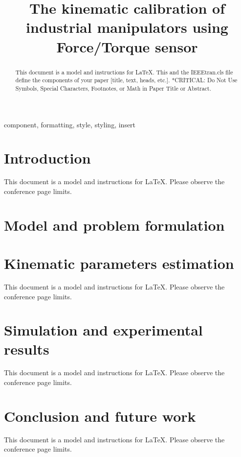 \documentclass[conference]{IEEEtran}
\begin{document}
\title{
    The kinematic calibration of industrial manipulators using Force/Torque sensor
}

\author{
}

\maketitle

\begin{abstract}
    This document is a model and instructions for \LaTeX.
    This and the IEEEtran.cls file define the components of your paper [title, text, heads, etc.]. *CRITICAL: Do Not Use Symbols, Special Characters, Footnotes,
or Math in Paper Title or Abstract.
\end{abstract}

\begin{IEEEkeywords}
    component, formatting, style, styling, insert
\end{IEEEkeywords}

\section{Introduction}
This document is a model and instructions for \LaTeX.
Please observe the conference page limits.

\section{Model and problem formulation}


\section{Kinematic parameters estimation}
This document is a model and instructions for \LaTeX.
Please observe the conference page limits.

\section{Simulation and experimental results}
This document is a model and instructions for \LaTeX.
Please observe the conference page limits.

\section{Conclusion and future work}
This document is a model and instructions for \LaTeX.
Please observe the conference page limits.
\end{document}
